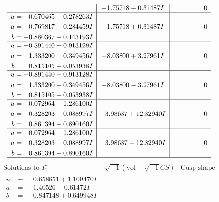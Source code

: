 \documentclass[1p]{elsarticle_modified}
\theoremstyle{definition}
\newcommand{\I}{\sqrt{-1}}
\begin{document}
$$\begin{array}{c|c|c}
 & -1.75718 - 0.31487 I & \phantom{-0.000000 } 0 \\ \hline\begin{aligned}
u &= \phantom{-}0.670465 - 0.278263 I \\
a &= -0.769817 + 0.284459 I \\
b &= -0.880367 + 0.143193 I\end{aligned}
 & -1.75718 + 0.31487 I & \phantom{-0.000000 } 0 \\ \hline\begin{aligned}
u &= -0.891440 + 0.913128 I \\
a &= \phantom{-}1.333200 + 0.349456 I \\
b &= \phantom{-}0.815105 - 0.053938 I\end{aligned}
 & -8.03800 + 3.27961 I & \phantom{-0.000000 } 0 \\ \hline\begin{aligned}
u &= -0.891440 - 0.913128 I \\
a &= \phantom{-}1.333200 - 0.349456 I \\
b &= \phantom{-}0.815105 + 0.053938 I\end{aligned}
 & -8.03800 - 3.27961 I & \phantom{-0.000000 } 0 \\ \hline\begin{aligned}
u &= \phantom{-}0.072964 + 1.286100 I \\
a &= -0.328203 + 0.088997 I \\
b &= \phantom{-}0.861394 - 0.890160 I\end{aligned}
 & \phantom{-}3.98637 + 12.32940 I & \phantom{-0.000000 } 0 \\ \hline\begin{aligned}
u &= \phantom{-}0.072964 - 1.286100 I \\
a &= -0.328203 - 0.088997 I \\
b &= \phantom{-}0.861394 + 0.890160 I\end{aligned}
 & \phantom{-}3.98637 - 12.32940 I & \phantom{-0.000000 } 0\\
 \hline 
 \end{array}$$\newpage$$\begin{array}{c|c|c}  
\text{Solutions to }I^u_{1}& \I (\text{vol} + \sqrt{-1}CS) & \text{Cusp shape}\\
 \hline 
\begin{aligned}
u &= \phantom{-}0.658651 + 1.109470 I \\
a &= \phantom{-}1.40526 - 0.61472 I \\
b &= \phantom{-}0.847148 + 0.649948 I\end{aligned}

\end{array}$$
\end{document}
